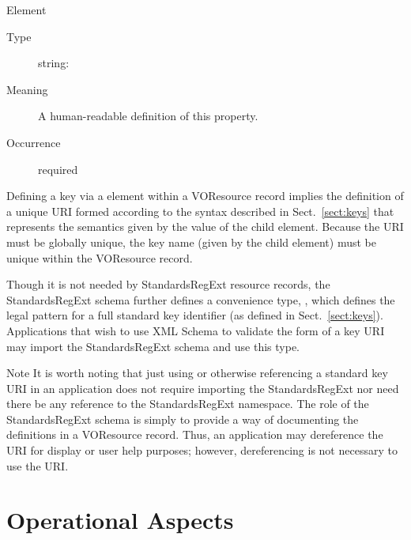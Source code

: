 \documentclass[11pt,a4paper]{ivoa}
\begin{document}
\begin{generated}
\begin{bigdescription}
\begin{description}
\end{description}
\item[Element \xmlel{description}]
\begin{description}
\item[Type] string: 
\item[Meaning]
                  A human-readable definition of this property.

\item[Occurrence] required

\end{description}


\end{bigdescription}\endgroup

\endgroup
\end{generated}



Defining a key via a  element within a
VOResource record implies the definition of a unique URI formed
according to the syntax described in Sect.~\ref{sect:keys}
that represents the semantics given by the value of the
 child element.  Because the URI must
be globally unique, the key name (given by the
 child element) must be unique within the
VOResource record.

Though it is not needed by StandardsRegExt resource records, the StandardsRegExt
schema further defines a convenience type,
, which defines the legal pattern for
a full standard key identifier (as defined in
Sect.~\ref{sect:keys}).  Applications that wish to use
XML Schema to validate the form of a key URI may import the StandardsRegExt
schema and use this type.


\begin{admonition}{Note}
It is worth noting that just using or otherwise referencing a
standard key URI in an application does not require importing
the StandardsRegExt nor need there be any reference to the
StandardsRegExt namespace.  The role of the StandardsRegExt schema is
simply to provide a way of documenting the definitions in a
VOResource record.  Thus, an application may dereference the
URI for display or user help purposes; however, dereferencing
is not necessary to use the URI.
\end{admonition}

\section{Operational Aspects}
\label{sect:operations}
\end{document}
